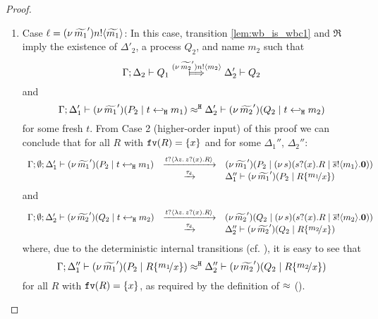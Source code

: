 \begin{proof}
\begin{enumerate}[1.]
		\item	Case $\ell = (\nu\, \widetilde{m_1}') n ! \langle \widetilde{m_1} \rangle$: In this case, 
 transition \eqref{lem:wb_is_wbc1} and $\Re$ imply the existence of $\Delta'_2$, a process $Q_2$, and name $m_2$ such that 
			\[
				\horel{\Gamma}{\Delta_2}{Q_1}{\Hby{\news{\widetilde{m_2}'} \bactout{n}{m_2}}}{\Delta_2'}{Q_2}
			\]
				\noi and
			\[
				\Gamma; \Delta_1' \vdash (\nu\, \widetilde{m_1}')(P_2 \;|\; t \hookleftarrow_{\mathtt{H}} m_1) \approx^\mathtt{H} \Delta_2' \vdash (\nu\, \widetilde{m_2}')(Q_2 \;|\; t \hookleftarrow_{\mathtt{H}} m_2)
			\]
			 for some fresh $t$.
				\noi From Case 2 (higher-order input) of this proof
				we can conclude that for all $R$ with $\mathtt{fv}(R) = \{x\}$ and for some $\Delta_1''$, $\Delta_2''$:
			\[
				\begin{array}{rcl}
					\Gamma; \es; \Delta_1' \proves \newsp{\widetilde{m_1}'}{P_2 \Par \htrigger{t}{m_1}} 
					& \by{\bactinp{t}{\abs{z}{\binp{z}{x} R}}}& \newsp{\widetilde{m_1}'}{P_2 \Par \newsp{s}{\binp{s}{x} R \Par \bout{\dual{s}}{m_1} \inact }}\\
					& \by{\dtau}   &\Delta_1'' \proves \newsp{\widetilde{m_1}'}{P_2 \Par  R \subst{m_1}{x}}
				\end{array}
			\]
				\noi and
			\[
				\begin{array}{rcl}
					\Gamma; \es; \Delta_2' \proves \newsp{\widetilde{m_2}'}{Q_2 \Par \htrigger{t}{m_2} } 
					& \by{\bactinp{t}{\abs{z}{\binp{z}{x} R}}} &\newsp{\widetilde{m_2}'}{Q_2 \Par \newsp{s}{\binp{s}{x} R \Par \bout{\dual{s}}{m_2} \inact}}\\
					& \by{\dtau} &\Delta_2'' \proves \newsp{\widetilde{m_2}'}{Q_2 \Par  R \subst{m_2}{x}}
				\end{array}
			\]
			where, due to the deterministic internal transitions (cf. ), it is easy to see that 
			\[
				\horel{\Gamma}{\Delta_1''}{\newsp{\widetilde{m_1}'}{P_2 \Par  R \subst{m_1}{x}}}{\hwb}{\Delta_2''}{\newsp{\widetilde{m_2}'}{Q_2 \Par R \subst{m_2}{x}} }
			\]
			for all $R$ with $\mathtt{fv}(R) = \{x\}$, as required by the definition of $\approx$ ().


\end{enumerate}
\end{proof}
